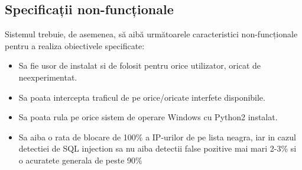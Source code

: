  \subsection{Specificații non-funcționale}

Sistemul trebuie, de asemenea, să aibă următoarele caracteristici non-funcționale pentru a realiza obiectivele specificate:
\begin{itemize}
  \item Sa fie usor de instalat si de folosit pentru orice utilizator, oricat de neexperimentat.
  \item Sa poata intercepta traficul de pe orice/oricate interfete disponibile.
  \item Sa poata rula pe orice sistem de operare Windows cu Python2 instalat.
  \item Sa aiba o rata de blocare de 100\% a IP-urilor de pe lista neagra, iar
  in cazul detectiei de SQL injection sa nu aiba detectii false pozitive mai mari 2-3\%
  si o acuratete generala de peste 90\%
\end{itemize}



